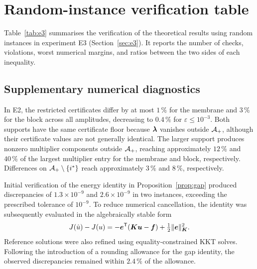 \appendix

\section{Random-instance verification table}\label{app:e3}

Table~\ref{tab:e3} summarises the verification of the theoretical results using random instances in experiment E3 (Section~\ref{sec:e3}). It reports the number of checks, violations, worst numerical margins, and ratios between the two sides of each inequality.

\begin{table}[H]
\centering\scriptsize
\caption{Verification of theoretical statements on $3000$ random instances (E3). Conditional statements are tested only when their assumptions hold. Lemma~\ref{lem:phi} is evaluated using S1 and two random nonnegative multipliers per instance, while Theorem~\ref{thm:support} is tested for two supports. The worst margin represents the minimum scaled inequality slack or the negative maximum scaled identity discrepancy; values above $-10^{-9}$ are accepted. The final column reports the median and range of the left-to-right bound ratio, with the lower-bound ratio defined in reverse order.}
\label{tab:e3}
\resizebox{\linewidth}{!}{}
\end{table}

\subsection{Supplementary numerical diagnostics}\label{app:e2diag}

In E2, the restricted certificates differ by at most $1\,\%$ for the membrane and $3\,\%$ for the block across all amplitudes, decreasing to $0.4\,\%$ for $\varepsilon\le10^{-3}$. Both supports have the same certificate floor because $\boldsymbol{\lambda}$ vanishes outside $\mathcal{A}_{+}$, although their certificate values are not generally identical. The larger support produces nonzero multiplier components outside $\mathcal{A}_{+}$, reaching approximately $12\,\%$ and $40\,\%$ of the largest multiplier entry for the membrane and block, respectively. Differences on $\mathcal{A}_{+}\setminus\{i^\ast\}$ reach approximately $3\,\%$ and $8\,\%$, respectively.

Initial verification of the energy identity in Proposition~\ref{prop:gap} produced discrepancies of $1.3\times10^{-9}$ and $2.6\times10^{-9}$ in two instances, exceeding the prescribed tolerance of $10^{-9}$. To reduce numerical cancellation, the identity was subsequently evaluated in the algebraically stable form
\[
J(\hat u)-J(u)=-\boldsymbol{e}^{\mathsf{T}}(\boldsymbol{K}\boldsymbol{u}-\boldsymbol{f})+\tfrac12\lVert \boldsymbol{e} \rVert_{\boldsymbol{K}}^2.
\]
Reference solutions were also refined using equality-constrained KKT solves. Following the introduction of a rounding allowance for the gap identity, the observed discrepancies remained within $2.4\,\%$ of the allowance.
